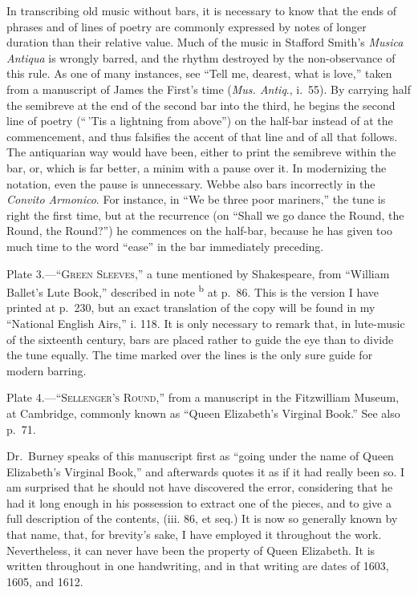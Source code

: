 %


In transcribing old music without bars, it is necessary to know that the ends of 
phrases and of lines of poetry are commonly expressed by notes of longer duration
than their relative value. Much of the music in Stafford Smith's \textit{Musica Antiqua} is
wrongly barred, and the rhythm destroyed by the non-observance of this rule. As
one of many instances, see “Tell me, dearest, what is love,” taken from a manuscript
of James the First’s time (\textit{Mus. Antiq}., i.~55). By carrying half the semibreve at
the end of the second bar into the third, he begins the second line of poetry (“\,'Tis
a lightning from above”) on the half-bar instead of at the commencement, and thus
falsifies the accent of that line and of all that follows. The antiquarian way would have
been, either to print the semibreve within the bar, or, which is far better, a minim with
a pause over it. In modernizing the notation, even the pause is unnecessary. Webbe
also bars incorrectly in the \textit{Convito Armonico}. For instance, in “We be three poor
mariners,” the tune is right the first time, but at the recurrence (on “Shall we go
dance the Round, the Round, the Round?”) he commences on the half-bar, because
he has given too much time to the word “ease” in the bar immediately preceding.

\bigskip
Plate 3.—“\textsc{Green Sleeves},” a tune mentioned by Shakespeare, from “Will\-iam
Ballet’s Lute Book,” described in note \textsuperscript{b} at p.~86. This is the version I have printed
at p.~230, but an exact translation of the copy will be found in my “National English
Airs,” i. 118. It is only necessary to remark that, in lute-music of the sixteenth
century, bars are placed rather to guide the eye than to divide the tune equally. The
time marked over the lines is the only sure guide for modern barring.

\bigskip
Plate 4.—“\textsc{Sellenger’s Round},” from a manuscript in the Fitzwilliam Museum,
at Cambridge, commonly known as “Queen Elizabeth’s Virginal Book.” See also
p.~71.

Dr.~Burney speaks of this manuscript first as “going under the name of Queen
Elizabeth’s Virginal Book,” and afterwards quotes it as if it had really been so.
I am surprised that he should not have discovered the error, considering that he had it
long enough in his possession to extract one of the pieces, and to give a full description
of the contents, (iii. 86, et seq.) It is now so generally known by that name,
that, for brevity’s sake, I have employed it throughout the work. Nevertheless, it
can never have been the property of Queen Elizabeth. It is written throughout in
one handwriting, and in that writing are dates of 1603, 1605, and 1612.

